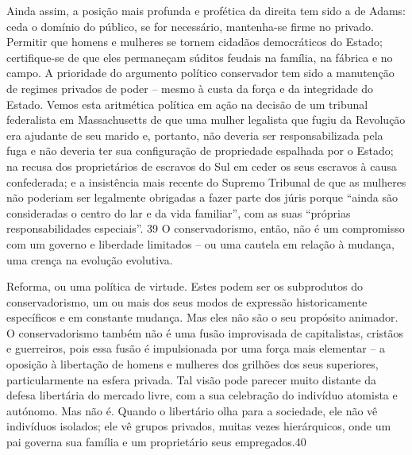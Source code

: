 Ainda assim, a posição mais profunda e profética da direita tem sido a de Adams: ceda o domínio do público, se for necessário, mantenha-se firme no privado. Permitir que homens e mulheres se tornem cidadãos democráticos do Estado; certifique-se de que eles permaneçam súditos feudais na família, na fábrica e no campo. A prioridade do argumento político conservador tem sido a manutenção de regimes privados de poder – mesmo à custa da força e da integridade do Estado. Vemos esta aritmética política em ação na decisão de um tribunal federalista em Massachusetts de que uma mulher legalista que fugiu da Revolução era ajudante de seu marido e, portanto, não deveria ser responsabilizada pela fuga e não deveria ter sua configuração de propriedade espalhada por o Estado; na recusa dos proprietários de escravos do Sul em ceder os seus escravos à causa confederada; e a insistência mais recente do Supremo Tribunal de que as mulheres não poderiam ser legalmente obrigadas a fazer parte dos júris porque “ainda são consideradas o centro do lar e da vida familiar”, com as suas “próprias responsabilidades especiais”. {\color{blue}39} O conservadorismo, então, não é um compromisso com um governo e liberdade limitados – ou uma cautela em relação à mudança, uma crença na evolução evolutiva.
 \par 
Reforma, ou uma política de virtude. Estes podem ser os subprodutos do conservadorismo, um ou mais dos seus modos de expressão historicamente específicos e em constante mudança. Mas eles não são o seu propósito animador. O conservadorismo também não é uma fusão improvisada de capitalistas, cristãos e guerreiros, pois essa fusão é impulsionada por uma força mais elementar – a oposição à libertação de homens e mulheres dos grilhões dos seus superiores, particularmente na esfera privada. Tal visão pode parecer muito distante da defesa libertária do mercado livre, com a sua celebração do indivíduo atomista e autónomo. Mas não é. Quando o libertário olha para a sociedade, ele não vê indivíduos isolados; ele vê grupos privados, muitas vezes hierárquicos, onde um pai governa sua família e um proprietário seus empregados.{\color{blue}40}
 \par 

